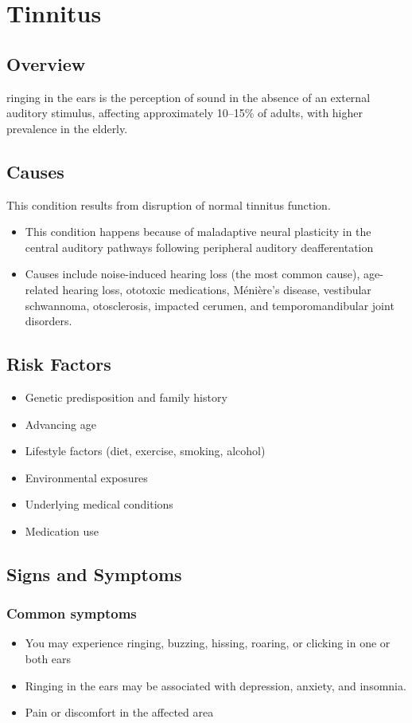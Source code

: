 \chapter{Tinnitus}
\label{sec:Tinnitus}

\section{Overview}
ringing in the ears is the perception of sound in the absence of an external auditory stimulus, affecting approximately 10--15\% of adults, with higher prevalence in the elderly.
\section{Causes}
This condition results from disruption of normal tinnitus function.

\begin{itemize}[noitemsep]
  \item This condition happens because of maladaptive neural plasticity in the central auditory pathways following peripheral auditory deafferentation
  \item Causes include noise-induced hearing loss (the most common cause), age-related hearing loss, ototoxic medications, M\'{e}ni\`{e}re's disease, vestibular schwannoma, otosclerosis, impacted cerumen, and temporomandibular joint disorders.
\end{itemize}
\section{Risk Factors}


\begin{itemize}[noitemsep]
  \item Genetic predisposition and family history
  \item Advancing age
  \item Lifestyle factors (diet, exercise, smoking, alcohol)
  \item Environmental exposures
  \item Underlying medical conditions
  \item Medication use
\end{itemize}
\section{Signs and Symptoms}

\subsection{Common symptoms}
\begin{itemize}[noitemsep]
  \item You may experience ringing, buzzing, hissing, roaring, or clicking in one or both ears
  \item Ringing in the ears may be associated with depression, anxiety, and insomnia.
  \item Pain or discomfort in the affected area
  \end{itemize}

